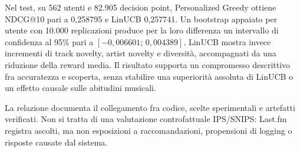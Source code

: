 \documentclass[11pt,a4paper,oneside]{report}
\begin{document}
Nel test, su 562 utenti e 82.905 decision point, Personalized Greedy ottiene NDCG@10 pari a 0,258795 e LinUCB 0,257741. Un bootstrap appaiato per utente con 10.000 replicazioni produce per la loro differenza un intervallo di confidenza al 95\% pari a $[-0{,}006601;\,0{,}004389]$. LinUCB mostra invece incrementi di track novelty, artist novelty e diversità, accompagnati da una riduzione della reward media. Il risultato supporta un compromesso descrittivo fra accuratezza e scoperta, senza stabilire una superiorità assoluta di LinUCB o un effetto causale sulle abitudini musicali.

La relazione documenta il collegamento fra codice, scelte sperimentali e artefatti verificati. Non si tratta di una valutazione controfattuale IPS/SNIPS: Last.fm registra ascolti, ma non esposizioni a raccomandazioni, propensioni di logging o risposte causate dal sistema.
{\small\tableofcontents}
\clearpage{}








\clearpage{}


\appendix

\end{document}
